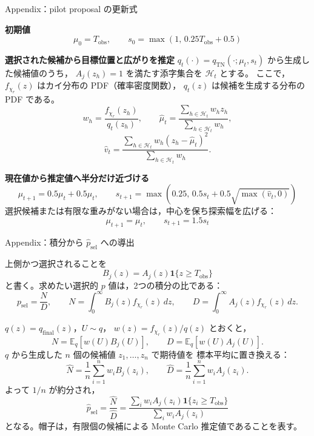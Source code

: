 \documentclass[aspectratio=169,11pt]{beamer}
\begin{document}
\begin{frame}{Appendix：pilot proposal の更新式}
  \small
  \setlength{\abovedisplayskip}{4pt}
  \setlength{\belowdisplayskip}{4pt}

  \textbf{初期値}\quad
  \[
    \mu_0=T_{\mathrm{obs}},\qquad
    s_0=\max\!\left(1,\,0.25T_{\mathrm{obs}}+0.5\right)
  \]

  \textbf{選択された候補から目標位置と広がりを推定}\quad
  $q_t(\cdot)=q_{\mathrm{TN}}(\cdot;\mu_t,s_t)$ から生成した候補値のうち，
  $A_j(z_h)=1$ を満たす添字集合を $\mathcal H_t$ とする。
  ここで，$f_{\chi_r}(z)$ はカイ分布の PDF（確率密度関数），
  $q_t(z)$ は候補を生成する分布の PDF である。
  \[
    w_h=\frac{f_{\chi_r}(z_h)}{q_t(z_h)},\qquad
    \widehat\mu_t
      =\frac{\sum_{h\in\mathcal H_t}w_hz_h}
             {\sum_{h\in\mathcal H_t}w_h},
  \]
  \[
    \widehat v_t
      =\frac{\sum_{h\in\mathcal H_t}w_h
        (z_h-\widehat\mu_t)^2}
             {\sum_{h\in\mathcal H_t}w_h}.
  \]

  \textbf{現在値から推定値へ半分だけ近づける}
  \[
    \boxed{
    \mu_{t+1}=0.5\mu_t+0.5\widehat\mu_t,\qquad
    s_{t+1}
      =\max\!\left(0.25,\,
        0.5s_t+0.5\sqrt{\max(\widehat v_t,0)}\right)}
  \]
  選択候補または有限な重みがない場合は，中心を保ち探索幅を広げる：
  \[
    \mu_{t+1}=\mu_t,\qquad s_{t+1}=1.5s_t
  \]
\end{frame}

\begin{frame}{Appendix：積分から $\widehat p_{\mathrm{sel}}$ への導出}
  \small
  \setlength{\abovedisplayskip}{5pt}
  \setlength{\belowdisplayskip}{5pt}

  上側かつ選択されることを
  \[
    B_j(z)=A_j(z)\mathbf1\{z\ge T_{\mathrm{obs}}\}
  \]
  と書く。求めたい選択的 $p$ 値は，2つの積分の比である：
  \[
    p_{\mathrm{sel}}=\frac{N}{D},\qquad
    N=\int_0^\infty B_j(z)f_{\chi_r}(z)\,dz,\qquad
    D=\int_0^\infty A_j(z)f_{\chi_r}(z)\,dz.
  \]

  $q(z)=q_{\mathrm{final}}(z)$，$U\sim q$，
  $w(z)=f_{\chi_r}(z)/q(z)$ とおくと，
  \[
    N=\mathbb E_q[w(U)B_j(U)],\qquad
    D=\mathbb E_q[w(U)A_j(U)].
  \]
  $q$ から生成した $n$ 個の候補値 $z_1,\ldots,z_n$ で期待値を
  標本平均に置き換える：
  \[
    \widehat N=\frac1n\sum_{i=1}^n w_iB_j(z_i),\qquad
    \widehat D=\frac1n\sum_{i=1}^n w_iA_j(z_i).
  \]
  よって $1/n$ が約分され，
  \[
    \boxed{
    \widehat p_{\mathrm{sel}}
      =\frac{\widehat N}{\widehat D}
      =\frac{\sum_iw_iA_j(z_i)
        \mathbf1\{z_i\ge T_{\mathrm{obs}}\}}
             {\sum_iw_iA_j(z_i)}}
  \]
  となる。帽子は，有限個の候補による Monte Carlo 推定値であることを表す。
\end{frame}
\end{document}
